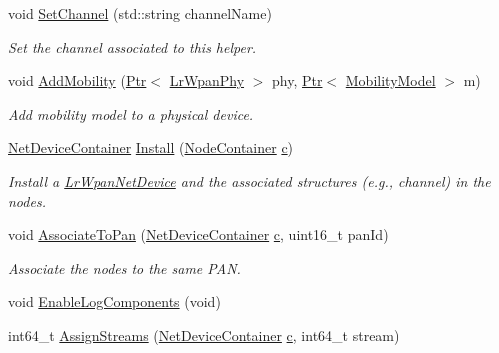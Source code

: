 \begin{DoxyCompactItemize}
void \hyperlink{classns3_1_1LrWpanHelper_ab53d24f611fcb726eb401aa046913fde}{Set\+Channel} (std\+::string channel\+Name)
\begin{DoxyCompactList}\small\item\em Set the channel associated to this helper. \end{DoxyCompactList}\item 
void \hyperlink{classns3_1_1LrWpanHelper_ab9f32918f8bd883d21eaf4a9a212bf32}{Add\+Mobility} (\hyperlink{classns3_1_1Ptr}{Ptr}$<$ \hyperlink{classns3_1_1LrWpanPhy}{Lr\+Wpan\+Phy} $>$ phy, \hyperlink{classns3_1_1Ptr}{Ptr}$<$ \hyperlink{classns3_1_1MobilityModel}{Mobility\+Model} $>$ m)
\begin{DoxyCompactList}\small\item\em Add mobility model to a physical device. \end{DoxyCompactList}\item 
\hyperlink{classns3_1_1NetDeviceContainer}{Net\+Device\+Container} \hyperlink{classns3_1_1LrWpanHelper_a7863b7b79168f747197faf479e4951fe}{Install} (\hyperlink{classns3_1_1NodeContainer}{Node\+Container} \hyperlink{mmwave_2model_2fading-traces_2fading__trace__generator_8m_ae0323a9039add2978bf5b49550572c7c}{c})
\begin{DoxyCompactList}\small\item\em Install a \hyperlink{classns3_1_1LrWpanNetDevice}{Lr\+Wpan\+Net\+Device} and the associated structures (e.\+g., channel) in the nodes. \end{DoxyCompactList}\item 
void \hyperlink{classns3_1_1LrWpanHelper_a3721e2624f82dfe56f03f1764afe3a07}{Associate\+To\+Pan} (\hyperlink{classns3_1_1NetDeviceContainer}{Net\+Device\+Container} \hyperlink{mmwave_2model_2fading-traces_2fading__trace__generator_8m_ae0323a9039add2978bf5b49550572c7c}{c}, uint16\+\_\+t pan\+Id)
\begin{DoxyCompactList}\small\item\em Associate the nodes to the same P\+AN. \end{DoxyCompactList}\item 
void \hyperlink{classns3_1_1LrWpanHelper_a897bfee8ce0c3e4340545423cb3a69af}{Enable\+Log\+Components} (void)
\item 
int64\+\_\+t \hyperlink{classns3_1_1LrWpanHelper_ac1d1e4e6c469b77f40a54a452f2d8edc}{Assign\+Streams} (\hyperlink{classns3_1_1NetDeviceContainer}{Net\+Device\+Container} \hyperlink{mmwave_2model_2fading-traces_2fading__trace__generator_8m_ae0323a9039add2978bf5b49550572c7c}{c}, int64\+\_\+t stream)
\end{DoxyCompactItemize}
